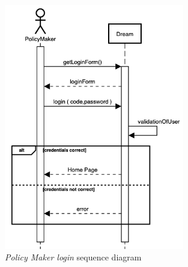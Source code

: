 \begin{enumerate}
    \begin{figure}[H]
        \begin{center}
        \includegraphics[width=0.7\textwidth]{sequence/PolicyMakerLogin.png}
        \caption{\emph{Policy Maker login} sequence diagram}
        \label{fig:sequence10}
        \end{center}
    \end{figure}


\end{enumerate}
